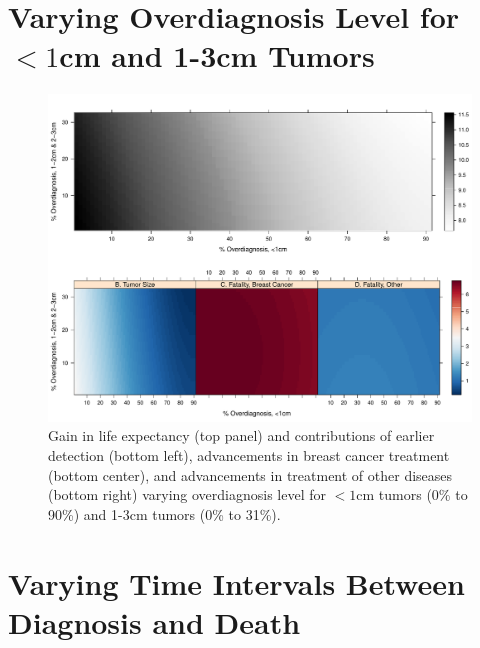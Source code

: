 \documentclass[11pt,letterpaper]{article}
\theoremstyle{plain}
\theoremstyle{remark}
\numberwithin{equation}{section}
\begin{document}
\section{Varying Overdiagnosis Level for $<1$cm and 1-3cm Tumors}
\begin{figure}[h]
\begin{center}
\includegraphics[width=\linewidth]{appendix_figure2}
\caption{Gain in life expectancy (top panel) and contributions of
  earlier detection (bottom left), advancements in breast cancer
  treatment (bottom center), and
  advancements in treatment of other diseases (bottom right) varying overdiagnosis
  level for $<1$cm tumors (0\% to 90\%) and 1-3cm tumors (0\% to 31\%).} 
\label{fig:simple_case}
\end{center}
\end{figure}

\newpage
\section{Varying Time Intervals Between Diagnosis and Death}
\end{document}
